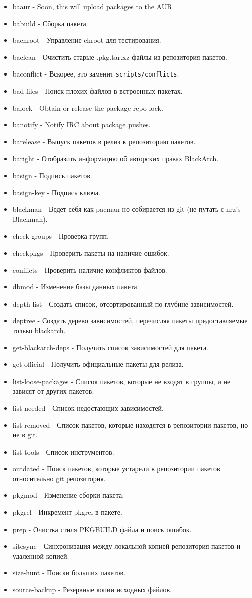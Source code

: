 \documentclass[a4paper, oneside, 11pt]{book}
\begin{document}
\begin{itemize}
\item baaur - Soon, this will upload packages to the AUR.
\item babuild - Сборка пакета.
\item bachroot - Управление chroot для тестирования.
\item baclean - Очистить старые .pkg.tar.xz файлы из репозитория пакетов.
\item baconflict - Вскорее, это заменит \verb|scripts/conflicts|.
\item bad-files - Поиск плохих файлов в встроенных пакетах.
\item balock - Obtain or release the package repo lock.
\item banotify - Notify IRC about package pushes.
\item barelease - Выпуск пакетов в релиз к репозиторию пакетов. 
\item baright - Отобразить информацию об авторских правах BlackArch.
\item basign - Подпись пакетов.
\item basign-key - Подпись ключа.
\item blackman - Ведет себя как pacman но собирается из git
    (не путать с nrz's Blackman).
\item check-groups - Проверка групп.
\item checkpkgs - Проверить пакеты на наличие ошибок.
\item conflicts - Проверить наличие конфликтов файлов.
\item dbmod - Изменение базы данных пакета.
\item depth-list - Создать список, отсортированный по глубине зависимостей.
\item deptree - Создать дерево зависимостей, перечисляя пакеты предоставляемые 
    только blackarch.
\item get-blackarch-deps - Получить список зависимостей для пакета.
\item get-official - Получить официальные пакеты для релиза.
\item list-loose-packages - Список пакетов, которые не входят в группы,
    и не зависят от других пакетов.
\item list-needed - Список недостающих зависимостей.
\item list-removed - Список пакетов, которые находятся в репозитории пакетов, но не в git.
\item list-tools - Список инструментов.
\item outdated - Поиск пакетов, которые устарели в репозитории пакетов
    относительно git репозитория.
\item pkgmod - Изменение сборки пакета.
\item pkgrel - Инкремент pkgrel в пакете.
\item prep - Очистка стиля PKGBUILD файла и поиск ошибок.
\item sitesync - Синхронизация между локальной копией репозитория пакетов и удаленной копией.
\item size-hunt - Поиски больших пакетов.
\item source-backup - Резервные копии исходных файлов.
\end{itemize}
\end{document}

